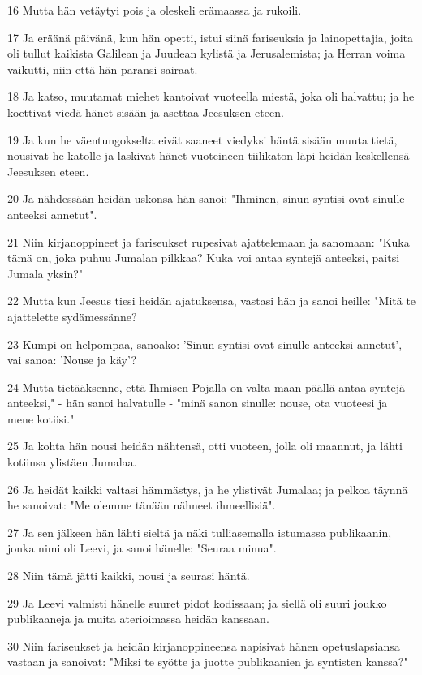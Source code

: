 \par 16 Mutta hän vetäytyi pois ja oleskeli erämaassa ja rukoili.
\par 17 Ja eräänä päivänä, kun hän opetti, istui siinä fariseuksia ja lainopettajia, joita oli tullut kaikista Galilean ja Juudean kylistä ja Jerusalemista; ja Herran voima vaikutti, niin että hän paransi sairaat.
\par 18 Ja katso, muutamat miehet kantoivat vuoteella miestä, joka oli halvattu; ja he koettivat viedä hänet sisään ja asettaa Jeesuksen eteen.
\par 19 Ja kun he väentungokselta eivät saaneet viedyksi häntä sisään muuta tietä, nousivat he katolle ja laskivat hänet vuoteineen tiilikaton läpi heidän keskellensä Jeesuksen eteen.
\par 20 Ja nähdessään heidän uskonsa hän sanoi: "Ihminen, sinun syntisi ovat sinulle anteeksi annetut".
\par 21 Niin kirjanoppineet ja fariseukset rupesivat ajattelemaan ja sanomaan: "Kuka tämä on, joka puhuu Jumalan pilkkaa? Kuka voi antaa syntejä anteeksi, paitsi Jumala yksin?"
\par 22 Mutta kun Jeesus tiesi heidän ajatuksensa, vastasi hän ja sanoi heille: "Mitä te ajattelette sydämessänne?
\par 23 Kumpi on helpompaa, sanoako: 'Sinun syntisi ovat sinulle anteeksi annetut', vai sanoa: 'Nouse ja käy'?
\par 24 Mutta tietääksenne, että Ihmisen Pojalla on valta maan päällä antaa syntejä anteeksi," - hän sanoi halvatulle - "minä sanon sinulle: nouse, ota vuoteesi ja mene kotiisi."
\par 25 Ja kohta hän nousi heidän nähtensä, otti vuoteen, jolla oli maannut, ja lähti kotiinsa ylistäen Jumalaa.
\par 26 Ja heidät kaikki valtasi hämmästys, ja he ylistivät Jumalaa; ja pelkoa täynnä he sanoivat: "Me olemme tänään nähneet ihmeellisiä".
\par 27 Ja sen jälkeen hän lähti sieltä ja näki tulliasemalla istumassa publikaanin, jonka nimi oli Leevi, ja sanoi hänelle: "Seuraa minua".
\par 28 Niin tämä jätti kaikki, nousi ja seurasi häntä.
\par 29 Ja Leevi valmisti hänelle suuret pidot kodissaan; ja siellä oli suuri joukko publikaaneja ja muita aterioimassa heidän kanssaan.
\par 30 Niin fariseukset ja heidän kirjanoppineensa napisivat hänen opetuslapsiansa vastaan ja sanoivat: "Miksi te syötte ja juotte publikaanien ja syntisten kanssa?"
